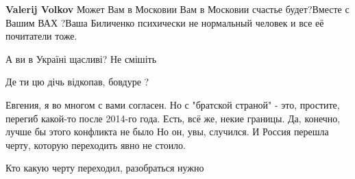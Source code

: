 \begin{itemize}
\begin{itemize}
 
\textbf{Valerij Volkov} Может Вам в Московии Вам в Московии счастье будет?Вместе с Вашим ВАХ ?Ваша Биличенко психически не нормальный человек и все её почитатели тоже.

 
А ви в Україні щасливі?
Не смішіть

 
Де ти цю дічь відкопав, бовдуре ?
🤣
\end{itemize}

 
\obeycr
Евгения, я во многом с вами согласен.
Но с "братской страной" - это, простите, перегиб какой-то после 2014-го года.
Есть, всё же, некие границы.
Да, конечно, лучше бы этого конфликта не было
Но он, увы, случился.
И Россия перешла черту, которую переходить явно не стоило.
\restorecr

\begin{itemize}
 
Кто какую черту переходил, разобраться нужно

 

\end{itemize}
\end{itemize}
